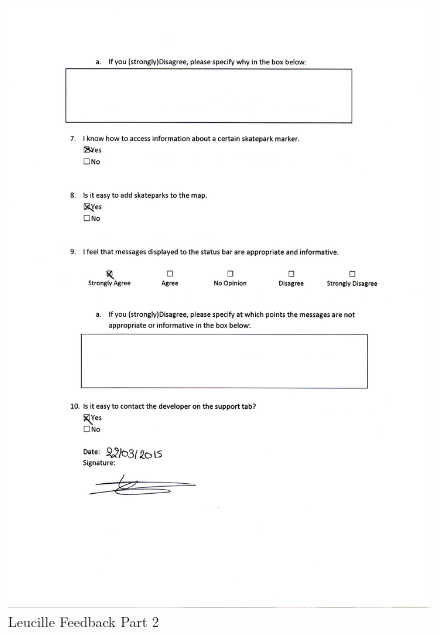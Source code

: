 \begin{itemize}
\begin{figure}[H]
    \includegraphics[width=\textwidth]{./Evaluation/images/LeucilleFeedback2.pdf}
    \caption{Leucille Feedback Part 2} \label{fig:LeucilleFeedback2}
\end{figure}


\end{itemize}

